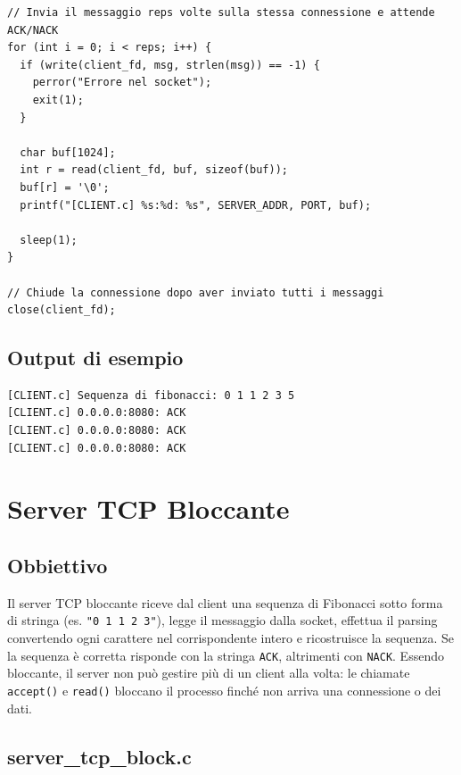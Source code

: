 \documentclass[a4paper,12pt]{article}
\begin{document}
\begin{lstlisting}[caption={client.c - loop write/read}]
// Invia il messaggio reps volte sulla stessa connessione e attende ACK/NACK
for (int i = 0; i < reps; i++) {
  if (write(client_fd, msg, strlen(msg)) == -1) {
    perror("Errore nel socket");
    exit(1);
  }

  char buf[1024];
  int r = read(client_fd, buf, sizeof(buf));
  buf[r] = '\0';
  printf("[CLIENT.c] %s:%d: %s", SERVER_ADDR, PORT, buf);

  sleep(1);
}

// Chiude la connessione dopo aver inviato tutti i messaggi
close(client_fd);
\end{lstlisting}
\FloatBarrier

\subsection{Output di esempio}

\begin{lstlisting}[style=output,caption={Output client - ./client 5 3}]
[CLIENT.c] Sequenza di fibonacci: 0 1 1 2 3 5
[CLIENT.c] 0.0.0.0:8080: ACK
[CLIENT.c] 0.0.0.0:8080: ACK
[CLIENT.c] 0.0.0.0:8080: ACK
\end{lstlisting}
\FloatBarrier

\section{Server TCP Bloccante}

\subsection{Obbiettivo}
Il server TCP bloccante riceve dal client una sequenza di Fibonacci sotto forma
di stringa (es. \texttt{"0 1 1 2 3"}), legge il messaggio dalla socket, effettua
il parsing convertendo ogni carattere nel corrispondente intero e ricostruisce
la sequenza. Se la sequenza è corretta risponde con la stringa \texttt{ACK},
altrimenti con \texttt{NACK}.
\newline
Essendo bloccante, il server non può gestire più di un client alla volta:
le chiamate \texttt{accept()} e \texttt{read()} bloccano il processo finché
non arriva una connessione o dei dati.


\subsection{server\_tcp\_block.c}
\end{document}
